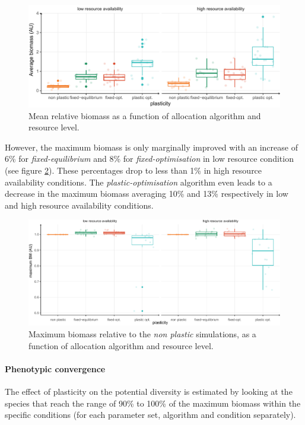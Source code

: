 \begin{figure}\label{fig:mean_BM_pl}
\includegraphics[width = \textwidth]{./2_PP/Figures/Landscape/plot_BM_allocation.pdf}
\caption{Mean relative biomass as a function of allocation algorithm and resource level.}
\end{figure}

However, the maximum biomass is only marginally improved with an increase of 6\% for \textit{fixed-equilibrium} and 8\% for \textit{fixed-optimisation} in low resource condition (see figure \ref{fig:max_BM_pl}). These percentages drop to less than 1\% in high resource availability conditions. The \textit{plastic-optimisation} algorithm even leads to a decrease in the maximum biomass averaging 10\% and 13\% respectively in low and high resource availability conditions.

\begin{figure}\label{fig:max_BM_pl}
\includegraphics[width = \textwidth]{./2_PP/Figures/Landscape/plot_maxBM_allocation.pdf}
\caption{Maximum biomass relative to the \textit{non plastic} simulations, as a function of allocation algorithm and resource level.}
\end{figure}

\paragraph{Phenotypic convergence}

The effect of plasticity on the potential diversity is estimated by looking at the species that reach the range of 90\% to 100\% of the maximum biomass within the specific conditions (for each parameter set, algorithm and condition separately).

